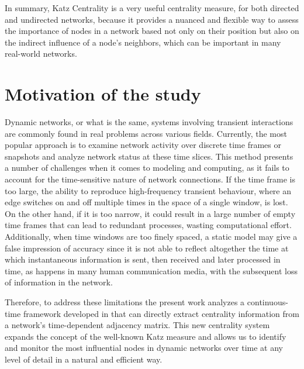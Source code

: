 In summary, Katz Centrality is a very useful centrality measure, for both directed and undirected networks, because it provides a nuanced and flexible way to assess the importance of nodes in a network based not only on their position but also on the indirect influence of a node's neighbors, which can be important in many real-world networks.



\section{Motivation of the study}
\label{sec:motiv}
Dynamic networks, or what is the same, systems involving transient interactions are commonly found in real problems across various fields. Currently, the most popular approach is to examine network activity over discrete time frames or snapshots and analyze network status at these time slices. This method presents a number of challenges when it comes to modeling and computing, as it fails to account for the time-sensitive nature of network connections. If the time frame is too large, the ability to reproduce high-frequency transient behaviour, where an edge switches on and off multiple times in the space of a single window, is lost. On the other hand, if it is too narrow, it could result in a large number of empty time frames that can lead to redundant processes, wasting computational effort. Additionally, when time windows are too finely spaced, a static model may give a false impression of accuracy since it is not able to reflect altogether the time at which instantaneous information is sent, then received and later processed in time, as happens in many human communication media, with the subsequent loss of information in the network.

Therefore, to address these limitations the present work analyzes a continuous-time framework developed in \cite{grindrod2014dynamical} that can directly extract centrality information from a network's time-dependent adjacency matrix. This new centrality system expands the concept of the well-known Katz measure and allows us to identify and monitor the most influential nodes in dynamic networks over time at any level of detail in a natural and efficient way.

